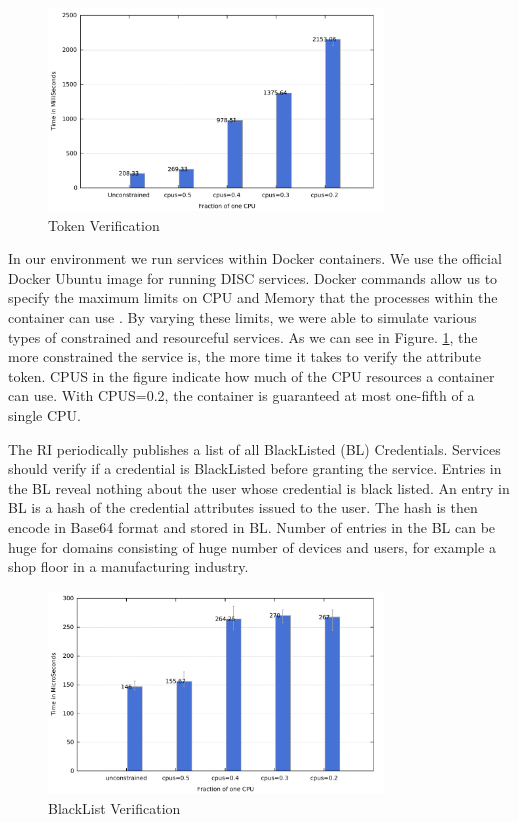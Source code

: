 \documentclass[journal]{IEEEtran}
\begin{document}
\begin{figure}[htbp]
\centerline{\includegraphics[width=3.5in]{verification.pdf}}
\caption{Token Verification}
\label{fig:token_ver}
\end{figure}

In our environment we run services within Docker containers. We use the official Docker Ubuntu image \cite{docker} for running DISC services. Docker commands allow us to specify the maximum limits on CPU and Memory that the processes within the container can use \cite{cpu}. By varying these limits, we were able to simulate various types of constrained and resourceful services. As we can see in Figure. \ref{fig:token_ver}, the more constrained the service is, the more time it takes to verify the attribute token. CPUS in the figure indicate how much of the CPU resources a container can use. With CPUS=0.2, the container is guaranteed at most one-fifth of a single CPU.

The RI periodically publishes a list of all BlackListed (BL) Credentials. Services should verify if a credential is BlackListed before granting the service. Entries in the BL reveal nothing about the user whose credential is black listed. An entry in BL is a hash of the credential attributes issued to the user. The hash is then encode in Base64 format and stored in BL. Number of entries in the BL can be huge for domains consisting of huge number of devices and users, for example a shop floor in a manufacturing industry.

\begin{figure}[htbp]
\centerline{\includegraphics[width=3.5in]{blacklist.pdf}}
\caption{BlackList Verification}
\label{fig:blacklist}
\end{figure}
\end{document}
